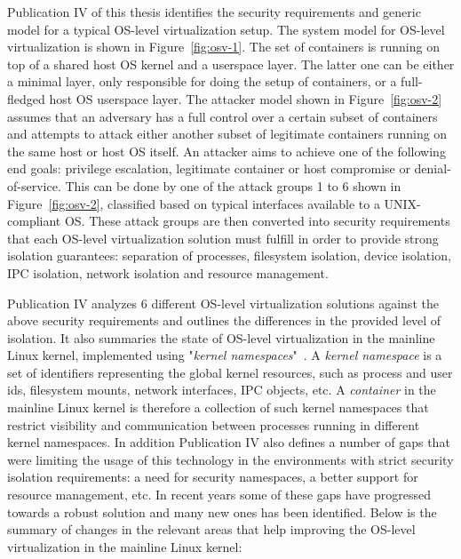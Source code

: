 Publication IV of this thesis identifies the security requirements and generic model for a typical OS-level virtualization setup.
The system model for OS-level virtualization is shown in Figure~\ref{fig:osv-1}. The set of containers  is running on top of a shared host OS kernel and a userspace layer. The latter one can be either a minimal layer, only responsible for doing the setup of containers, or a full-fledged host OS userspace layer. The attacker model shown in Figure~\ref{fig:osv-2} assumes that an adversary has a full control over a certain subset of containers and attempts to attack either another subset of legitimate containers running on the same host or host OS itself. An attacker aims to achieve one of the following end goals: privilege escalation, legitimate container or host compromise or denial-of-service. This can be done by one of the attack groups 1 to 6 shown in Figure~\ref{fig:osv-2}, classified based on typical interfaces available to a UNIX-compliant OS. These attack groups are then converted into security requirements that each OS-level virtualization solution must fulfill in order to provide strong isolation guarantees: separation of processes, filesystem isolation, device isolation, IPC isolation, network isolation and resource management.   

Publication IV analyzes 6 different OS-level virtualization solutions against the above security requirements and outlines the differences in the provided level of isolation. It also summaries the state of OS-level virtualization in the mainline Linux kernel, implemented using "\textit{kernel namespaces}"~\cite{biederman2006}. A \textit{kernel namespace} is a set of identifiers representing the global kernel resources, such as process and user ids, filesystem mounts, network interfaces, IPC objects, etc. A \textit{container} in the mainline Linux kernel is therefore a collection of such kernel namespaces that restrict visibility and communication between processes running in different kernel namespaces. In addition Publication IV also defines a number of gaps that were limiting the usage of this technology in the environments with strict security isolation requirements: a need for security namespaces, a better support for resource management, etc. In recent years some of these gaps have progressed towards a robust solution and many new ones has been identified. Below is the summary of changes in the relevant areas that help improving the OS-level virtualization in the mainline Linux kernel:  

